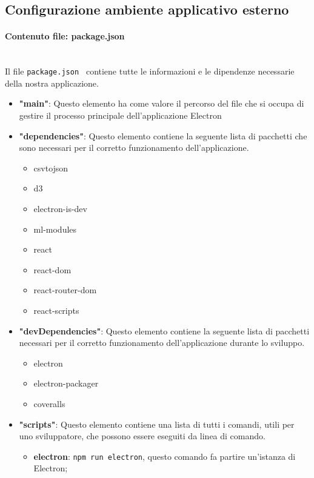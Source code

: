 \subsection{Configurazione ambiente applicativo esterno}
\paragraph{Contenuto file: package.json}\mbox{}\\ [1mm]
Il file \verb|package.json | contiene tutte le informazioni e le dipendenze necessarie della nostra applicazione.
\begin{itemize}
    \item \textbf{"main"}: Questo elemento ha come valore il percorso del file che si occupa di gestire il processo principale dell'applicazione Electron
    \item \textbf{"dependencies"}: Questo elemento contiene la seguente lista di pacchetti che sono necessari per il corretto funzionamento dell'applicazione.
        \begin{itemize}
            \item csvtojson
            \item d3
            \item electron-is-dev
            \item ml-modules
            \item react
            \item react-dom
            \item react-router-dom
            \item react-scripts
        \end{itemize}
    \item \textbf{"devDependencies"}: Questo elemento contiene la seguente lista di pacchetti necessari per il corretto funzionamento dell'applicazione durante lo sviluppo.
        \begin{itemize}
            \item electron
            \item electron-packager
            \item coveralls
        \end{itemize} 
    \item \textbf{"scripts"}: Questo elemento contiene una lista di tutti i comandi, utili per uno sviluppatore, che possono essere eseguiti da linea di comando.
        \begin{itemize}
            \item \textbf{electron}: \verb|npm run electron|, questo comando fa partire un'istanza di Electron;

\end{itemize}
\end{itemize}
